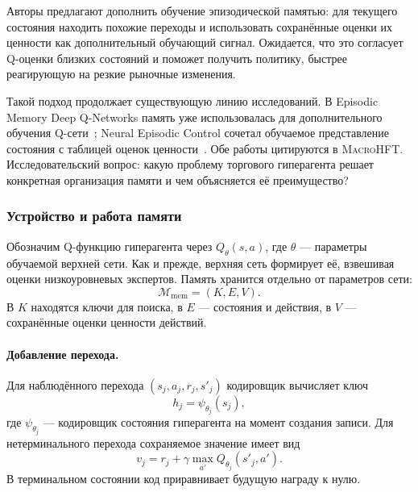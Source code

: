 \documentclass[9pt,a4paper,twocolumn]{extarticle}
\newcommand{\Macro}{\textsc{MacroHFT}}
\begin{document}
Авторы предлагают дополнить обучение эпизодической памятью: для текущего состояния находить
похожие переходы и использовать сохранённые оценки их ценности как дополнительный обучающий
сигнал. Ожидается, что это согласует Q-оценки близких состояний и поможет получить политику,
быстрее реагирующую на резкие рыночные изменения.

Такой подход продолжает существующую линию исследований. В Episodic Memory Deep Q-Networks
память уже использовалась для дополнительного обучения Q-сети~\cite{lin2018episodic}; Neural
Episodic Control сочетал обучаемое представление состояния с таблицей оценок
ценности~\cite{pritzel2017neural}. Обе работы цитируются в \Macro{}. Исследовательский вопрос:
какую проблему торгового гиперагента решает конкретная организация памяти и чем объясняется её
преимущество?

\subsubsection{Устройство и работа памяти}

Обозначим Q-функцию гиперагента через $Q_\theta(s,a)$, где $\theta$ --- параметры обучаемой
верхней сети. Как и прежде, верхняя сеть формирует её, взвешивая оценки низкоуровневых
экспертов. Память хранится отдельно от параметров сети:
\begin{equation}
  \mathcal M_{\mathrm{mem}}=(K,E,V).
  \label{eq:memory_structure}
\end{equation}
В $K$ находятся ключи для поиска, в $E$ --- состояния и действия, в $V$ --- сохранённые оценки
ценности действий.

\paragraph{Добавление перехода.}

Для наблюдённого перехода $(s_j,a_j,r_j,s'_j)$ кодировщик вычисляет ключ
\begin{equation}
  h_j=\psi_{\theta_j}(s_j),
  \label{eq:memory_key}
\end{equation}
где $\psi_{\theta_j}$ --- кодировщик состояния гиперагента на момент создания записи. Для
нетерминального перехода сохраняемое значение имеет вид
\begin{equation}
  v_j
  =
  r_j+\gamma\max_{a'}Q_{\theta_j}(s'_j,a').
  \label{eq:memory_stored_value}
\end{equation}
В терминальном состоянии код приравнивает будущую награду к нулю.
\end{document}
